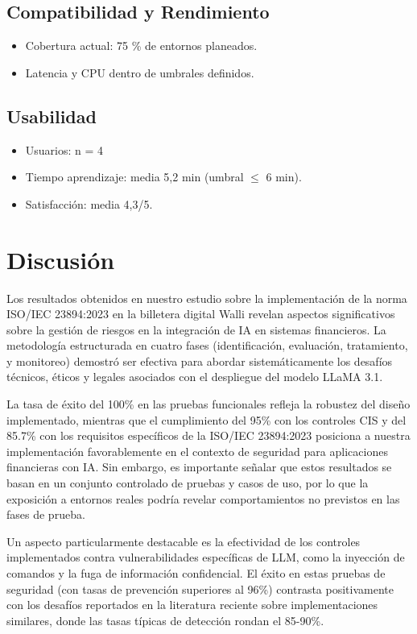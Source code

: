 \documentclass[12pt]{article}
\begin{document}
\subsection{Compatibilidad y Rendimiento}
\begin{itemize}
    \item Cobertura actual: 75 \% de entornos planeados.
    \item Latencia y CPU dentro de umbrales definidos.
\end{itemize}

\subsection{Usabilidad}
\begin{itemize}
    \item Usuarios: n = 4
    \item Tiempo aprendizaje: media 5,2 min (umbral $\leq$ 6 min).
    \item Satisfacción: media 4,3/5.
\end{itemize}

\section{Discusión}
Los resultados obtenidos en nuestro estudio sobre la implementación de la norma ISO/IEC 23894:2023 en la billetera digital Walli revelan aspectos significativos sobre la gestión de riesgos en la integración de IA en sistemas financieros. La metodología estructurada en cuatro fases (identificación, evaluación, tratamiento, y monitoreo) demostró ser efectiva para abordar sistemáticamente los desafíos técnicos, éticos y legales asociados con el despliegue del modelo LLaMA 3.1.

La tasa de éxito del 100\% en las pruebas funcionales refleja la robustez del diseño implementado, mientras que el cumplimiento del 95\% con los controles CIS y del 85.7\% con los requisitos específicos de la ISO/IEC 23894:2023 posiciona a nuestra implementación favorablemente en el contexto de seguridad para aplicaciones financieras con IA. Sin embargo, es importante señalar que estos resultados se basan en un conjunto controlado de pruebas y casos de uso, por lo que la exposición a entornos reales podría revelar comportamientos no previstos en las fases de prueba.

Un aspecto particularmente destacable es la efectividad de los controles implementados contra vulnerabilidades específicas de LLM, como la inyección de comandos y la fuga de información confidencial. El éxito en estas pruebas de seguridad (con tasas de prevención superiores al 96\%) contrasta positivamente con los desafíos reportados en la literatura reciente sobre implementaciones similares, donde las tasas típicas de detección rondan el 85-90\%.
\end{document}
